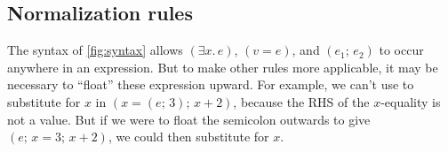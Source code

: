 \documentclass[acmsmall,review,anonymous,dvipsnames]{acmart}
\newcommand{\Varid}[1]{\mathit{#1}}
\begin{document}

\subsection{Normalization rules} \label{sec:gc} \label{sec:normalization}

\figureNormalizationRules

The syntax of \cref{fig:syntax} allows \ensuremath{(\exists\Varid{x}.\,\Varid{e})}, \ensuremath{(\Varid{v}=\Varid{e})}, and \ensuremath{(\Varid{e}_{\mathrm{1}};\,\Varid{e}_{\mathrm{2}})}
to occur anywhere
in an expression. But to make other rules more applicable, it may be necessary to
``float'' these expression upward.  For example, we can't use  to
substitute for \ensuremath{\Varid{x}} in \ensuremath{(\Varid{x}=(\Varid{e};\,\mathrm{3});\,\Varid{x}\mathbin{+}\mathrm{2})},
because the RHS of the \ensuremath{\Varid{x}}-equality is not a value.
But if we were to float the semicolon outwards to give \ensuremath{(\Varid{e};\,\Varid{x}\mathrel{=}\mathrm{3};\,\Varid{x}\mathbin{+}\mathrm{2})}, we could then
substitute for \ensuremath{\Varid{x}}.
\end{document}
